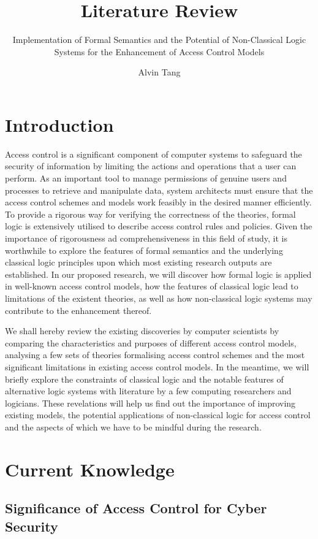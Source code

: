 \documentclass{article}
\title{Literature Review}
\subtitle{Implementation of Formal Semantics and the Potential of Non-Classical Logic Systems for the Enhancement of Access Control Models}
\author{Alvin Tang}
\date{}
\begin{document}
\maketitle

\section{Introduction}

Access control is a significant component of computer systems to safeguard the security of information by limiting the actions and operations that a user can perform. As an important tool to manage permissions of genuine users and processes to retrieve and manipulate data\cite{principles}, system architects must ensure that the access control schemes and models work feasibly in the desired manner efficiently. To provide a rigorous way for verifying the correctness of the theories, formal logic is extensively utilised to describe access control rules and policies. Given the importance of rigorousness ad comprehensiveness in this field of study, it is worthwhile to explore the features of formal semantics and the underlying classical logic principles upon which most existing research outputs are established. In our proposed research, we will discover how formal logic is applied in well-known access control models, how the features of classical logic lead to limitations of the existent theories, as well as how non-classical logic systems may contribute to the enhancement thereof.

We shall hereby review the existing discoveries by computer scientists by comparing the characteristics and purposes of different access control models, analysing a few sets of theories formalising access control schemes and the most significant limitations in existing access control models. In the meantime, we will briefly explore the constraints of classical logic and the notable features of alternative logic systems with literature by a few computing researchers and logicians. These revelations will help us find out the importance of improving existing models, the potential applications of non-classical logic for access control and the aspects of which we have to be mindful during the research.

\section{Current Knowledge}

\subsection{Significance of Access Control for Cyber Security}
\end{document}
